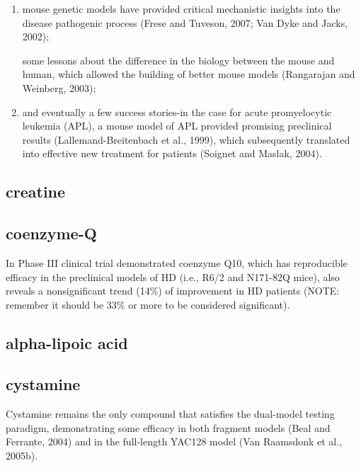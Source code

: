 \begin{enumerate}

  \item   mouse genetic models have provided critical mechanistic insights
into the disease pathogenic process (Frese and Tuveson, 2007; Van Dyke and
Jacks, 2002);

some lessons about the difference in the biology between the mouse and human,
which allowed the building of better mouse models (Rangarajan and Weinberg,
2003); 

   \item and eventually a few success stories-in the case for acute
   promyelocytic leukemia (APL), a mouse model of APL provided promising
   preclinical results (Lallemand-Breitenbach et al., 1999), which subsequently
   translated into effective new treatment for patients (Soignet and Maslak, 2004).

\end{enumerate}


\subsection{creatine}

\subsection{coenzyme-Q}

In Phase III clinical trial demonstrated coenzyme Q10, which has reproducible
efficacy in the preclinical models of HD (i.e., R6/2 and N171-82Q mice), also
reveals a nonsignificant trend (14\%) of improvement in HD patients (NOTE:
remember it should be 33\% or more to be considered significant).



\subsection{alpha-lipoic acid}

\subsection{cystamine}

Cystamine remains the only compound that satisfies the dual-model testing
paradigm, demonstrating some efficacy in both fragment models (Beal and
Ferrante, 2004) and in the full-length YAC128 model (Van Raamsdonk et al.,
2005b).



